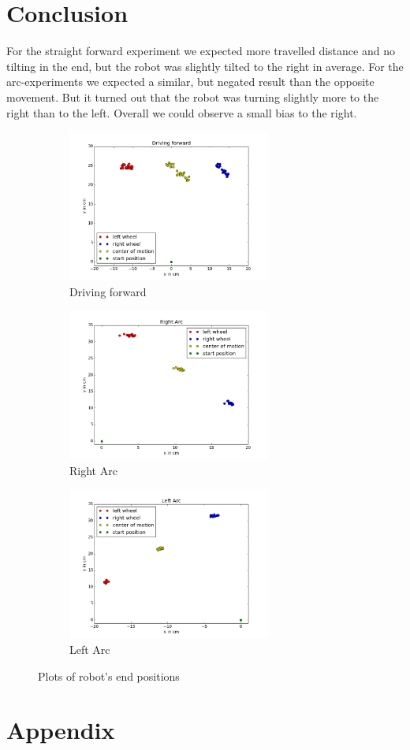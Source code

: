 \documentclass[paper=a4, fontsize=11pt]{scrartcl} %
\numberwithin{equation}{section} %
\numberwithin{figure}{section} %
\numberwithin{table}{section} %
\begin{document}
\section{Conclusion}
For the straight forward experiment we expected more travelled distance and no tilting in the end, but the robot was slightly tilted to the right in average.
For the arc-experiments we expected a similar, but negated result than the opposite movement.
But it turned out that the robot was turning slightly more to the right than to the left.
Overall we could observe a small bias to the right.


\begin{figure}[h]
 
\begin{subfigure}{0.5\textwidth}
\includegraphics[width=0.9\linewidth, height=5cm]{forward.png} 
\caption{Driving forward}
\label{fig:sub_forward}
\end{subfigure}
\begin{subfigure}{0.5\textwidth}
\includegraphics[width=0.9\linewidth, height=5cm]{right_arc.png}
\caption{Right Arc}
\label{fig:sub_right}
\end{subfigure}
\begin{subfigure}{0.5\textwidth}
\includegraphics[width=0.9\linewidth, height=5cm]{left_arc.png}
\caption{Left Arc}
\label{fig:sub_left}
\end{subfigure}
 
\caption{Plots of robot's end positions}
\label{fig:plots}
\end{figure}

\section{Appendix}
\label{sec:appendix}


\end{document}
